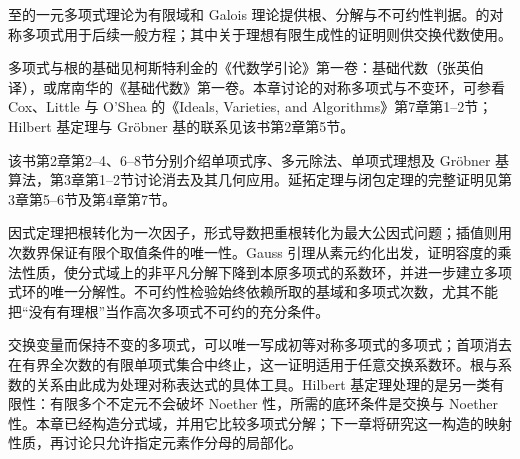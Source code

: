 \ProseParagraphBreak
{}至的一元多项式理论为有限域和 Galois 理论提供根、分解与不可约性判据。的对称多项式用于后续一般方程；其中关于理想有限生成性的证明则供交换代数使用。

\ProseParagraphBreak
多项式与根的基础见柯斯特利金的《代数学引论》第一卷：基础代数（张英伯译）\cite[第5--6章]{Kostrikin2006AlgebraIChinese}，或席南华的《基础代数》第一卷\cite[第6--7章]{Xi2016BasicAlgebraI}。本章讨论的对称多项式与不变环，可参看 Cox、Little 与 O’Shea 的《Ideals, Varieties, and Algorithms》第7章第1--2节\cite[Chapter 7, \S\S 1--2]{CoxLittleOShea2015IdealsVarietiesAlgorithms}；Hilbert 基定理与 Gröbner 基的联系见该书第2章第5节\cite[Chapter 2, \S 5]{CoxLittleOShea2015IdealsVarietiesAlgorithms}。

\ProseParagraphBreak
该书第2章第2--4、6--8节分别介绍单项式序、多元除法、单项式理想及 Gröbner 基算法，第3章第1--2节讨论消去及其几何应用\cite[Chapter 2, \S\S 2--4, 6--8; Chapter 3, \S\S 1--2]{CoxLittleOShea2015IdealsVarietiesAlgorithms}。延拓定理与闭包定理的完整证明见第3章第5--6节及第4章第7节\cite[Chapter 3, \S\S 5--6; Chapter 4, \S 7]{CoxLittleOShea2015IdealsVarietiesAlgorithms}。






\begin{chaptersummary}
	因式定理把根转化为一次因子，形式导数把重根转化为最大公因式问题；插值则用次数界保证有限个取值条件的唯一性。Gauss 引理从素元约化出发，证明容度的乘法性质，使分式域上的非平凡分解下降到本原多项式的系数环，并进一步建立多项式环的唯一分解性。不可约性检验始终依赖所取的基域和多项式次数，尤其不能把“没有有理根”当作高次多项式不可约的充分条件。

	\ProseParagraphBreak
	交换变量而保持不变的多项式，可以唯一写成初等对称多项式的多项式；首项消去在有界全次数的有限单项式集合中终止，这一证明适用于任意交换系数环。根与系数的关系由此成为处理对称表达式的具体工具。Hilbert 基定理处理的是另一类有限性：有限多个不定元不会破坏 Noether 性，所需的底环条件是交换与 Noether 性。本章已经构造分式域，并用它比较多项式分解；下一章将研究这一构造的映射性质，再讨论只允许指定元素作分母的局部化。
\end{chaptersummary}

\BookExercises

